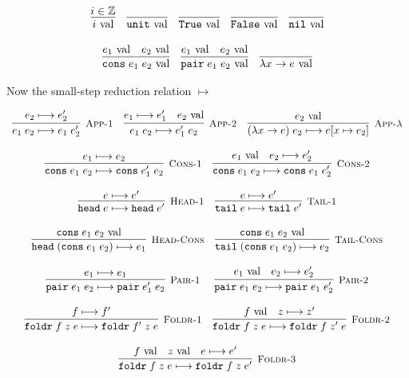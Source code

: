 \documentclass[10pt]{article}
\newcommand{\ttt}[1]{\texttt{#1}}
\newcommand{\ra}{\ensuremath{\rightarrow}}
\newcommand{\reduces}{\ensuremath{\longmapsto}}
\newcommand{\val}{\textnormal{ val}}
\newcommand{\True}{\ttt{True}}
\newcommand{\False}{\ttt{False}}
\newcommand{\head}{\ttt{head}}
\newcommand{\tail}{\ttt{tail}}
\newcommand{\cons}{\ttt{cons}}
\newcommand{\nil}{\ttt{nil}}
\newcommand{\unit}{\ttt{unit}}
\newcommand{\foldr}{\ttt{foldr}}
\newcommand{\pair}{\ttt{pair}}
\newcommand{\labinfer} [3] [] {\infer[{\small\textsc{#1}}]{#2}{#3}}
\begin{document}
\[
  \begin{array}{cc}
    \infer{i \val}{i \in \mathbb{Z}}
    ~~~
    \infer{\unit \val}{}
    ~~~
    \infer{\True \val}{}
    ~~~
    \infer{\False \val}{}
    ~~~
    \infer{\nil \val}{}
    \\\\
    \infer{\cons\; e_1\; e_2 \val}{e_1 \val & e_2 \val}
    ~~~
    \infer{\pair\; e_1\; e_2 \val}{e_1 \val & e_2 \val}
    ~~~
    \infer{\lambda x \ra e \val}{}
  \end{array}
\]

\noindent
Now the small-step reduction relation $\reduces$


\[
  \begin{array}{cc}
    \labinfer[App-1]{e_1\; e_2 \reduces e_1\; e_2'}{e_2 \reduces e_2'}
    ~~~
    \labinfer[App-2]{e_1\; e_2 \reduces e_1'\; e_2}{e_1 \reduces e_1' & e_2 \val}
    ~~~
    \labinfer[App-$\lambda$]{(\lambda x \ra e)\; e_2 \reduces e[x\mapsto e_2]}{e_2 \val}
    \\\\
    \labinfer[Cons-1]{\cons\; e_1\; e_2 \reduces \cons\; e_1'\; e_2}{e_1 \reduces e_2}
    ~~~
    \labinfer[Cons-2]{\cons\; e_1\; e_2 \reduces \cons\; e_1\; e_2'}{e_1 \val & e_2 \reduces e_2'}
    \\\\
    \labinfer[Head-1]{\head\; e \reduces \head\; e'}{e \reduces e'}
    ~~~
    \labinfer[Tail-1]{\tail\; e \reduces \tail\; e'}{e \reduces e'}
    \\\\
    \labinfer[Head-Cons]{\head\; (\cons\; e_1\; e_2) \reduces e_1}{\cons\; e_1\; e_2 \val}
    ~~~
    \labinfer[Tail-Cons]{\tail\; (\cons\; e_1\; e_2) \reduces e_2}{\cons\; e_1\; e_2 \val}
    \\\\
    \labinfer[Pair-1]{\pair\; e_1\; e_2 \reduces \pair\; e_1'\; e_2}{e_1 \reduces e_1}
    ~~~~
    \labinfer[Pair-2]{\pair\; e_1\; e_2 \reduces \pair\; e_1\; e_2'}{e_1 \val & e_2 \reduces e_2'}
    \\\\
    \labinfer[Foldr-1]{\foldr\; f\; z\; e \reduces \foldr\; f'\; z\; e}{f \reduces f'}
    ~~~
    \labinfer[Foldr-2]{\foldr\; f\; z\; e \reduces \foldr\; f\; z'\; e}{f \val & z \reduces z'}
    \\\\
    \labinfer[Foldr-3]{\foldr\; f\; z\; e \reduces \foldr\; f\; z\; e'}{f \val & z \val & e \reduces e'}
    \\\\

\end{array}\]
\end{document}
